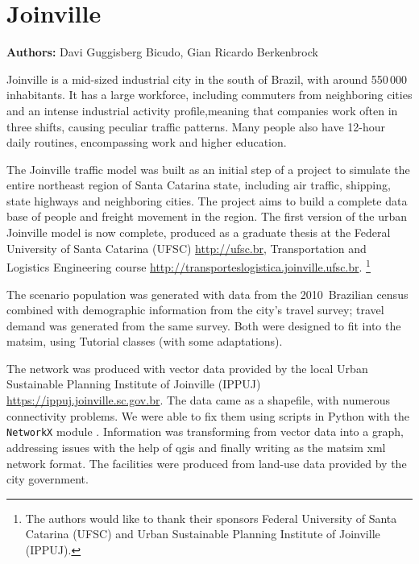 \chapter{Joinville}
\label{ch:joinville}
\hfill \textbf{Authors:} Davi Guggisberg Bicudo, Gian Ricardo Berkenbrock

Joinville \cite{pmj} is a mid-sized industrial city in the south of Brazil, with around 550\,000 inhabitants. It has a large workforce, including commuters from neighboring cities and an intense industrial activity profile,meaning that companies work often in three shifts, causing peculiar traffic patterns.  Many people also have 12-hour daily routines, encompassing work and higher education. 

The Joinville traffic model was built as an initial step of a project to simulate the entire northeast region of Santa Catarina state, including air traffic, shipping, state highways and neighboring cities. The project aims to build a complete data base of people and freight movement in the region. The first version of the urban Joinville model is now complete, produced as a graduate thesis at the Federal University of Santa Catarina (UFSC) \url{http://ufsc.br}, Transportation and Logistics Engineering course \url{http://transporteslogistica.joinville.ufsc.br}.%
\footnote{The authors would like to thank their sponsors Federal University of Santa Catarina (UFSC) and Urban Sustainable Planning Institute of Joinville (IPPUJ).} 

The scenario population was generated with data from the 2010~Brazilian census combined with demographic information from the city’s travel survey; travel demand was generated from the same survey. Both were designed to fit into the \gls{matsim}, using Tutorial classes (with some adaptations).

The network was produced with vector data provided by the local Urban Sustainable Planning Institute of Joinville (IPPUJ) \url{https://ippuj.joinville.sc.gov.br}. The data came as a shapefile, with numerous connectivity problems. We were able to fix them using scripts in Python with the \lstinline|NetworkX| module \cite{networkx}. Information was transforming  from vector data into a graph, addressing issues with the help of \gls{qgis} and finally writing as the \gls{matsim} \gls{xml} network format. The facilities were produced from land-use data provided by the city government.

